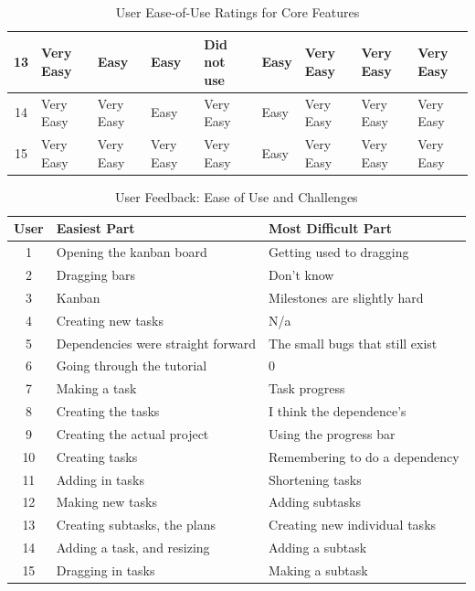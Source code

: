 \documentclass[12pt,nonacm,acmlarge,titlepage,screen]{acmart}
\begin{document}
\begin{table}[htbp]
\begin{tabularx}{\textwidth}{| c | *{8}{X |}}
        13 & Very Easy & Easy      & Easy      & Did not use & Easy      & Very Easy & Very Easy & Very Easy \\ \hline
        14 & Very Easy & Very Easy & Easy      & Very Easy   & Easy      & Very Easy & Very Easy & Very Easy \\ \hline
        15 & Very Easy & Very Easy & Very Easy & Very Easy   & Easy      & Very Easy & Very Easy & Very Easy \\ \hline
    \end{tabularx}
    \caption{User Ease-of-Use Ratings for Core Features}
    \label{tab:feature_usability}
\end{table}

\clearpage

\begin{table}[H]
    \centering
    \small
    \renewcommand{\arraystretch}{1.4}

    \begin{tabularx}{\textwidth}{| c | X | X |}
        \hline
        \textbf{User} & \textbf{Easiest Part} & \textbf{Most Difficult Part} \\
        \hline
        1 & Opening the kanban board & Getting used to dragging \\ \hline
        2 & Dragging bars & Don't know \\ \hline
        3 & Kanban & Milestones are slightly hard \\ \hline
        4 & Creating new tasks & N/a \\ \hline
        5 & Dependencies were straight forward & The small bugs that still exist \\ \hline
        6 & Going through the tutorial & 0 \\ \hline
        7 & Making a task & Task progress \\ \hline
        8 & Creating the tasks & I think the dependence's \\ \hline
        9 & Creating the actual project & Using the progress bar \\ \hline
        10 & Creating tasks & Remembering to do a dependency \\ \hline
        11 & Adding in tasks & Shortening tasks \\ \hline
        12 & Making new tasks & Adding subtasks \\ \hline
        13 & Creating subtasks, the plans & Creating new individual tasks \\ \hline
        14 & Adding a task, and resizing & Adding a subtask \\ \hline
        15 & Dragging in tasks & Making a subtask \\ \hline
    \end{tabularx}
    \caption{User Feedback: Ease of Use and Challenges}
    \label{tab:qualitative_feedback_1}
\end{table}
\end{document}

